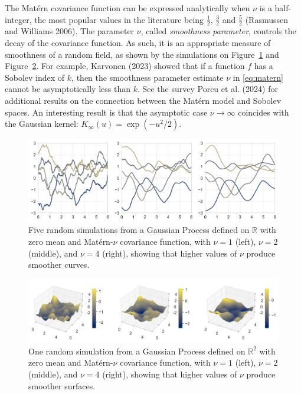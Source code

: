 \documentclass[
  12pt,
]{interact}
\theoremstyle{plain}
\begin{document}
The Matérn covariance function can be expressed analytically when
\(\nu\) is a half-integer, the most popular values in the literature
being \(\frac{1}{2}\), \(\frac{3}{2}\) and \(\frac{5}{2}\) (Rasmussen
and Williams 2006). The parameter \(\nu\), called \emph{smoothness
parameter}, controls the decay of the covariance function. As such, it
is an appropriate measure of smoothness of a random field, as shown by
the simulations on Figure~\ref{fig-matern-1d} and
Figure~\ref{fig-matern-2d}. For example, Karvonen (2023) showed that if
a function \(f\) has a Sobolev index of \(k\), then the smoothness
parameter estimate \(\nu\) in \eqref{eq:matern} cannot be asymptotically
less than \(k\). See the survey Porcu et al. (2024) for additional
results on the connection between the Matérn model and Sobolev spaces.
An interesting result is that the asymptotic case
\(\nu\rightarrow\infty\) coincides with the Gaussian kernel:
\(K_\infty(u)=\exp(-u^{2}/2)\).

\begin{figure}

{\centering \includegraphics[width=1\textwidth,height=\textheight]{figures/matern_simulation_1d.png}

}

\caption{\label{fig-matern-1d}Five random simulations from a Gaussian
Process defined on \(\mathbb{R}\) with zero mean and Matérn-\(\nu\)
covariance function, with \(\nu=1\) (left), \(\nu=2\) (middle), and
\(\nu=4\) (right), showing that higher values of \(\nu\) produce
smoother curves.}

\end{figure}

\begin{figure}

{\centering \includegraphics[width=1\textwidth,height=\textheight]{figures/matern_simulation_2d.png}

}

\caption{\label{fig-matern-2d}One random simulation from a Gaussian
Process defined on \(\mathbb{R}^2\) with zero mean and Matérn-\(\nu\)
covariance function, with \(\nu=1\) (left), \(\nu=2\) (middle), and
\(\nu=4\) (right), showing that higher values of \(\nu\) produce
smoother surfaces.}

\end{figure}
\end{document}
